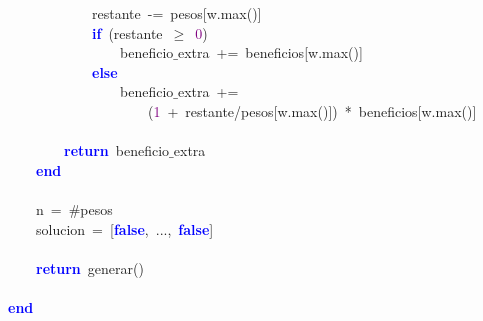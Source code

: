 \mbox{}\ \ \ \ \ \ \ \ \ \ \ \ restante\ \textcolor{BrickRed}{-=}\ pesos\textcolor{BrickRed}{[}w\textcolor{BrickRed}{.}max\textcolor{BrickRed}{()]} \\
\mbox{}\ \ \ \ \ \ \ \ \ \ \ \ \textbf{\textcolor{Blue}{if}}\ \textcolor{BrickRed}{(}restante\ \textcolor{BrickRed}{$\ge$}\ \textcolor{Purple}{0}\textcolor{BrickRed}{)} \\
\mbox{}\ \ \ \ \ \ \ \ \ \ \ \ \ \ \ \ beneficio$\_$extra\ \textcolor{BrickRed}{+=}\ beneficios\textcolor{BrickRed}{[}w\textcolor{BrickRed}{.}max\textcolor{BrickRed}{()]} \\
\mbox{}\ \ \ \ \ \ \ \ \ \ \ \ \textbf{\textcolor{Blue}{else}} \\
\mbox{}\ \ \ \ \ \ \ \ \ \ \ \ \ \ \ \ beneficio$\_$extra\ \textcolor{BrickRed}{+=} \\
\mbox{}\ \ \ \ \ \ \ \ \ \ \ \ \ \ \ \ \ \ \ \ \textcolor{BrickRed}{(}\textcolor{Purple}{1}\ \textcolor{BrickRed}{+}\ restante\textcolor{BrickRed}{/}pesos\textcolor{BrickRed}{[}w\textcolor{BrickRed}{.}max\textcolor{BrickRed}{()])}\ \textcolor{BrickRed}{*}\ beneficios\textcolor{BrickRed}{[}w\textcolor{BrickRed}{.}max\textcolor{BrickRed}{()]} \\
\mbox{} \\
\mbox{}\ \ \ \ \ \ \ \ \textbf{\textcolor{Blue}{return}}\ beneficio$\_$extra \\
\mbox{}\ \ \ \ \textbf{\textcolor{Blue}{end}} \\
\mbox{} \\
\mbox{}\ \ \ \ n\ \textcolor{BrickRed}{=}\ \#pesos \\
\mbox{}\ \ \ \ solucion\ \textcolor{BrickRed}{=}\ \textcolor{BrickRed}{[}\textbf{\textcolor{Blue}{false}}\textcolor{BrickRed}{,}\ \textcolor{BrickRed}{...,}\ \textbf{\textcolor{Blue}{false}}\textcolor{BrickRed}{]} \\
\mbox{} \\
\mbox{}\ \ \ \ \textbf{\textcolor{Blue}{return}}\ generar\textcolor{BrickRed}{()} \\
\mbox{} \\
\mbox{}\textbf{\textcolor{Blue}{end}} \\
\mbox{}
